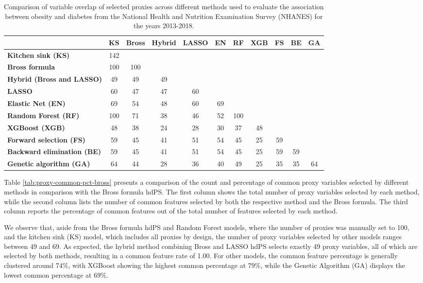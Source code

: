 \documentclass[sn-vancouver,Numbered,lineno,pdflatex]{sn-jnl}
\begin{document}
\begin{table}[htbp]
\centering
\caption{Comparison of variable overlap of selected proxies across different methods used to evaluate the association between obesity and diabetes from the National Health and Nutrition Examination Survey (NHANES) for the years 2013-2018.}
\label{tab:method-comparison-updated}
\begin{tabular}{lcccccccccc}
\toprule
 & \textbf{KS} & \textbf{Bross} & \textbf{Hybrid} & \textbf{LASSO} & \textbf{EN} & \textbf{RF} & \textbf{XGB} & \textbf{FS} & \textbf{BE} & \textbf{GA} \\
\midrule
\textbf{Kitchen sink (KS)} & 142 & & & & & & & & & \\
\textbf{Bross formula} & 100 & 100 & & & & & & & & \\
\textbf{Hybrid (Bross and LASSO)} & 49 & 49 & 49 & & & & & & & \\
\textbf{LASSO} & 60 & 47 & 47 & 60 & & & & & & \\
\textbf{Elastic Net (EN)} & 69 & 54 & 48 & 60 & 69 & & & & & \\
\textbf{Random Forest (RF)} & 100 & 71 & 38 & 46 & 52 & 100 & & & & \\  
\textbf{XGBoost (XGB)} & 48 & 38 & 24 & 28 & 30 & 37 & 48 & & & \\
\textbf{Forward selection (FS)} & 59 & 45 & 41 & 51 & 54 & 45 & 25 & 59 & & \\
\textbf{Backward elimination (BE)} & 59 & 45 & 41 & 51 & 54 & 45 & 25 & 59 & 59 & \\
\textbf{Genetic algorithm (GA)} & 64 & 44 & 28 & 36 & 40 & 49 & 25 & 35 & 35 & 64 \\
\bottomrule
\end{tabular}
\end{table}

Table \ref{tab:proxy-common-pct-bross} presents a comparison of the
count and percentage of common proxy variables selected by different
methods in comparison with the Bross formula hdPS. The first column
shows the total number of proxy variables selected by each method, while
the second column lists the number of common features selected by both
the respective method and the Bross formula. The third column reports
the percentage of common features out of the total number of features
selected by each method.

We observe that, aside from the Bross formula hdPS and Random Forest
models, where the number of proxies was manually set to 100, and the
kitchen sink (KS) model, which includes all proxies by design, the
number of proxy variables selected by other models ranges between 49 and
69. As expected, the hybrid method combining Bross and LASSO hdPS
selects exactly 49 proxy variables, all of which are selected by both
methods, resulting in a common feature rate of 1.00. For other models,
the common feature percentage is generally clustered around \(74\%\),
with XGBoost showing the highest common percentage at \(79\%\), while
the Genetic Algorithm (GA) displays the lowest common percentage at
\(69\%\).
\end{document}
